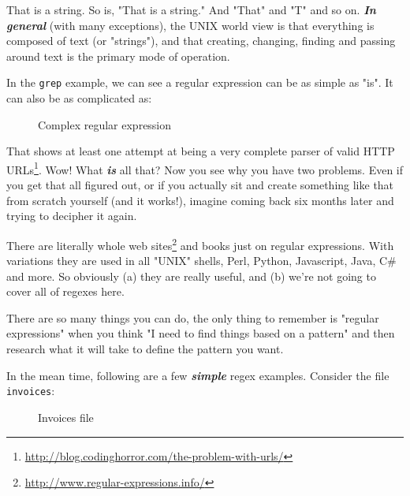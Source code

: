 \documentclass[10pt,american,]{book}
\newenvironment{Shaded}{\begin{snugshade}}{\end{snugshade}}
\newcommand{\KeywordTok}[1]{\textcolor[rgb]{0.13,0.29,0.53}{\textbf{{#1}}}}
\newcommand{\NormalTok}[1]{{#1}}
\renewcommand{\href}[2]{#2\footnote{\url{#1}}}
\numberwithin{figure}{chapter}
\DeclareRobustCommand{\drcap}[1]{\begin{figure}[H]\caption{#1}\end{figure}}
\renewcommand{\KeywordTok}[1]{{#1}}
\renewcommand{\NormalTok}[1]{{#1}}
\begin{document}
That is a string. So is, "That is a string." And "That" and "T" and so
on. \textbf{\emph{In general}} (with many exceptions), the UNIX world
view is that everything is composed of text (or "strings"), and that
creating, changing, finding and passing around text is the primary mode
of operation.

In the \texttt{grep} example, we can see a regular expression can be as
simple as "is". It can also be as complicated as:

\drcap{Complex regular expression}

\begin{Shaded}
\begin{Highlighting}[]
\KeywordTok{(?bhttp}\NormalTok{://[-A-Za-z0-9+}\KeywordTok{&@}\NormalTok{#/%
\end{Highlighting}
\end{Shaded}

That shows at least one attempt at being
\href{http://blog.codinghorror.com/the-problem-with-urls/}{a very
complete parser of valid HTTP URLs}. Wow! What \textbf{\emph{is}} all
that? Now you see why you have two problems. Even if you get that all
figured out, or if you actually sit and create something like that from
scratch yourself (and it works!), imagine coming back six months later
and trying to decipher it again.

There are literally \href{http://www.regular-expressions.info/}{whole
web sites} and books just on regular expressions. With variations they
are used in all "UNIX" shells, Perl, Python, Javascript, Java, C\# and
more. So obviously (a) they are really useful, and (b) we're not going
to cover all of regexes here.

There are so many things you can do, the only thing to remember is
"regular expressions" when you think "I need to find things based on a
pattern" and then research what it will take to define the pattern you
want.

In the mean time, following are a few \textbf{\emph{simple}} regex
examples. Consider the file \texttt{invoices}:

\drcap{Invoices file}

\begin{Shaded}
\end{Shaded}
\end{document}
